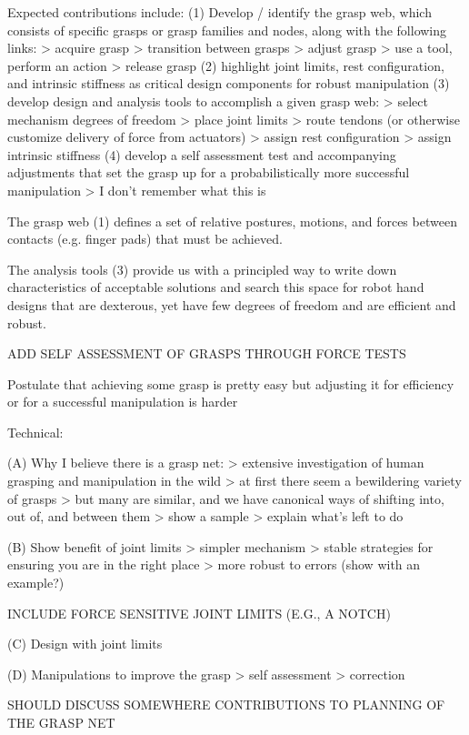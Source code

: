 Expected contributions include:
	(1) Develop / identify the grasp web, which consists of specific grasps or grasp families and nodes, along with the following links:
		> acquire grasp
		> transition between grasps
		> adjust grasp
		> use a tool, perform an action
		> release grasp
	(2) highlight joint limits, rest configuration, and intrinsic stiffness as critical design components for robust manipulation 
	(3) develop design and analysis tools to accomplish a given grasp web:
		> select mechanism degrees of freedom
		> place joint limits
		> route tendons (or otherwise customize delivery of force from actuators)
		> assign rest configuration 
		> assign intrinsic stiffness
	(4) develop a self assessment test and accompanying adjustments that set the  grasp up for a probabilistically more successful manipulation
		> I don't remember what this is
	
The grasp web (1) defines a set of relative postures, motions, and forces between contacts (e.g. finger pads) that must be achieved.

The analysis tools (3) provide us with a principled way to write down characteristics of acceptable solutions and search this space for robot hand designs that are dexterous, yet have few degrees of freedom and are efficient and robust.



ADD SELF ASSESSMENT OF GRASPS THROUGH FORCE TESTS

Postulate that achieving some grasp is pretty easy but adjusting it for efficiency or for a successful manipulation is harder

Technical:

(A) Why I believe there is a grasp net:
	> extensive investigation of human grasping and manipulation in the wild
	> at first there seem a bewildering variety of grasps
	> but many are similar, and we have canonical ways of shifting into, out of, and between them
	> show a sample
	> explain what's left to do
	
(B) Show benefit of joint limits
	> simpler mechanism
	> stable strategies for ensuring you are in the right place
	> more robust to errors (show with an example?)
	
	INCLUDE FORCE SENSITIVE JOINT LIMITS (E.G., A NOTCH)

(C) Design with joint limits

(D) Manipulations to improve the grasp
	> self assessment
	> correction


SHOULD DISCUSS SOMEWHERE CONTRIBUTIONS TO PLANNING OF THE GRASP NET

